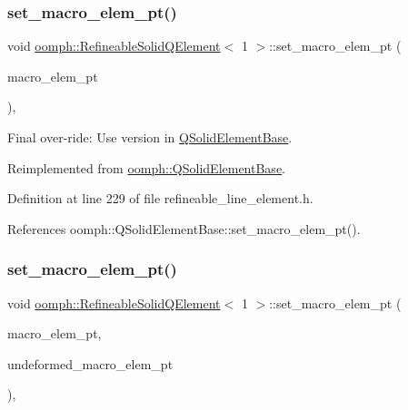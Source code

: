 \subsubsection{\texorpdfstring{set\+\_\+macro\+\_\+elem\+\_\+pt()}{set\_macro\_elem\_pt()}\hspace{0.1cm}{\footnotesize\ttfamily [1/2]}}
{\footnotesize\ttfamily void \hyperlink{classoomph_1_1RefineableSolidQElement}{oomph\+::\+Refineable\+Solid\+Q\+Element}$<$ 1 $>$\+::set\+\_\+macro\+\_\+elem\+\_\+pt (\begin{DoxyParamCaption}\item[{\hyperlink{classoomph_1_1MacroElement}{Macro\+Element} $\ast$}]{macro\+\_\+elem\+\_\+pt }\end{DoxyParamCaption})\hspace{0.3cm}{\ttfamily [inline]}, {\ttfamily [virtual]}}



Final over-\/ride\+: Use version in \hyperlink{classoomph_1_1QSolidElementBase}{Q\+Solid\+Element\+Base}. 



Reimplemented from \hyperlink{classoomph_1_1QSolidElementBase_a0ceca47c039bbb38b0feb3baa330a27f}{oomph\+::\+Q\+Solid\+Element\+Base}.



Definition at line 229 of file refineable\+\_\+line\+\_\+element.\+h.



References oomph\+::\+Q\+Solid\+Element\+Base\+::set\+\_\+macro\+\_\+elem\+\_\+pt().

\mbox{\label{classoomph_1_1RefineableSolidQElement_3_011_01_4_a9dd7e2622260d14c2bf92125707a3401}} 
\subsubsection{\texorpdfstring{set\+\_\+macro\+\_\+elem\+\_\+pt()}{set\_macro\_elem\_pt()}\hspace{0.1cm}{\footnotesize\ttfamily [2/2]}}
{\footnotesize\ttfamily void \hyperlink{classoomph_1_1RefineableSolidQElement}{oomph\+::\+Refineable\+Solid\+Q\+Element}$<$ 1 $>$\+::set\+\_\+macro\+\_\+elem\+\_\+pt (\begin{DoxyParamCaption}\item[{\hyperlink{classoomph_1_1MacroElement}{Macro\+Element} $\ast$}]{macro\+\_\+elem\+\_\+pt,  }\item[{\hyperlink{classoomph_1_1MacroElement}{Macro\+Element} $\ast$}]{undeformed\+\_\+macro\+\_\+elem\+\_\+pt }\end{DoxyParamCaption})\hspace{0.3cm}{\ttfamily [inline]}, {\ttfamily [virtual]}}



